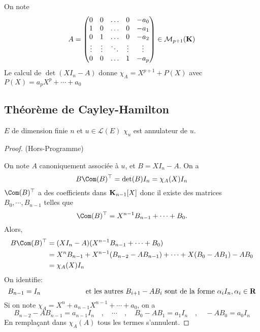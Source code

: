 \begin{ex} On note \[
    A= \begin{pmatrix}
0 & 0 & \dots & 0 & -a_0 \\
1 & 0 & \dots & 0 & -a_1 \\
0 & 1 & \dots & 0 & -a_2 \\
\vdots & \vdots & \ddots & \vdots & \vdots \\
0 & 0 & \dots & 1 & -a_{p} \\
\end{pmatrix}\in \mathcal M_{p+1}(\mathbf K)
\]
Le calcul de $\det(XI_n-A)$ donne $\chi_A=X^{p+1}+P(X)$ avec $P(X)=a_pX^p+\cdots +a_0$
\end{ex}

\subsection{Théorème de Cayley-Hamilton}

\begin{thm}
    \Hyp $E$ de dimension finie $n$ et $u\in\mathcal L(E)$
    \Conc $\chi_u$ est annulateur de $u$.
\end{thm}

\begin{proof} (Hors-Programme)

    On note $A$ canoniquement associée à $u$, et $B=XI_n-A$. On a \[
        B\Com(B)^\top = \det(B)I_n=\chi_A(X)I_n
    \]
    $\Com(B)^\top$ a des coefficients dans $\mathbf K_{n-1}[X]$ donc il existe des matrices $B_0, \cdots, B_{n-1}$ telles que \[
        \Com(B)^\top=X^{n-1}B_{n-1}+\cdots +B_0.
    \]
    Alors, \begin{align*}
        B\Com(B)^\top&=(XI_n-A)(X^{n-1}B_{n-1}+\cdots +B_0)\\
                     &=X^nB_{n-1}+X^{n-1}(B_{n-2}-AB_{n-1})+\cdots + X(B_0-AB_1)-AB_0\\
                     &=\chi_A(X)I_n
    \end{align*}
    On identifie: \[
        B_{n-1}=I_n\qquad \qquad \qquad \text{ et les autres }B_{i+1}-AB_i\text{ sont de la forme }\alpha_i I_n, \alpha_i\in\mathbf R
    \]
    Si on note $\chi_A=X^n+a_{n-1}X^{n-1}+\cdots +a_0$, on a \[
        B_{n-2}-AB_{n-1}=a_{n-1}I_n\quad , \quad \cdots \quad,\quad B_0-AB_1=a_1 I_n\quad,\quad  -AB_0=a_0I_n
    \]
    En remplaçant dans $\chi_A(A)$ tous les termes s'annulent.
\end{proof}

